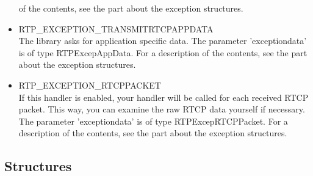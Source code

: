 \begin{itemize}
		of the contents, see the part about the exception structures.
	\item RTP\_EXCEPTION\_TRANSMITRTCPAPPDATA\\
		The library asks for application specific data. The parameter
		'exceptiondata' is of type RTPExcepAppData. For a description
		of the contents, see the part about the exception structures.
	\item RTP\_EXCEPTION\_RTCPPACKET\\
		If this handler is enabled, your handler will be called for
		each received RTCP packet. This way, you can examine the raw
		RTCP data yourself if necessary. The parameter 'exceptiondata'
		is of type RTPExcepRTCPPacket. For a description of the
		contents, see the part about the exception structures.
	\end{itemize}
	
\subsection{Structures}


